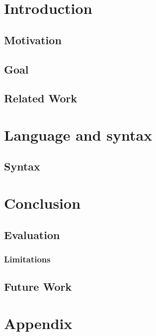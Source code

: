 \documentclass[11pt,a4paper]{scrbook}
\begin{document}





\tableofcontents
\newpage
{}
\chapter{Introduction}

\section{Motivation}
\label{sec:motivation}

\section{Goal}


\section{Related Work}


\chapter{Language and syntax}
\label{sec:language}

\section{Syntax}
\label{sec:cfg}


\chapter{Conclusion}


\section{Evaluation}


\subsection{Limitations}

\section{Future Work}


\chapter{Appendix}



\end{document}
